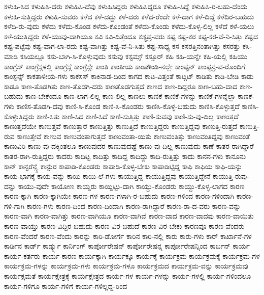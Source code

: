 {ಕಳುಹಿ-ಸಿದ
ಕಳುಹಿಸಿ-ದರು
ಕಳುಹಿಸಿ-ದೆವು
ಕಳುಹಿಸಿದ್ದರು
ಕಳುಹಿಸಿದ್ದರೂ
ಕಳುಹಿ-ಸಿದ್ದೆ
ಕಳುಹಿಸಿ-ರ-ಬಹು-ದೆಂದು
ಕಳುಹಿ-ಸುತ್ತಿದ್ದರು
ಕಳುಹಿ-ಸುವರು
ಕಳೆದ
ಕಳೆ-ದದ್ದು
ಕಳೆ-ದರು
ಕಳೆದ-ರೆಂದೇ
ಕಳೆ-ದಾಗ
ಕಳೆ-ದಿದ್ದೆ
ಕಳೆದಿರ-ಬಹುದು
ಕಳೆದಿ-ರು-ವುದು
ಕಳೆದು
ಕಳೆದು-ಕೊಂಡ
ಕಳೆದು-ಕೊಂಡಂತೆ
ಕಳೆದು-ಕೊಂಡು
ಕಳೆದು-ಕೊಳ್ಳ-ಲಿಲ್ಲ
ಕಳೆದೆ
ಕಳೆ-ಯಲು
ಕಳೆ-ಯುತ್ತಿದ್ದರು
ಕಳೆ-ಯುವು-ದಾಗಿಯೂ
ಕವಿ
ಕವಿ-ದಿತ್ತೆಂದೂ
ಕಶ್ಯಪ್ರ-ವರು
ಕಷ್ಟ
ಕಷ್ಟ-ಕರ
ಕಷ್ಟ-ಕರ-ವೆ-ನಿ-ಸಿತ್ತು
ಕಷ್ಟದ
ಕಷ್ಟ-ಪಟ್ಟೆವು
ಕಷ್ಟ-ವಾಗ-ಲಾ-ರದು
ಕಷ್ಟ-ವಾಗಿತ್ತು
ಕಷ್ಟ-ವೆ-ನಿ-ಸಿತು
ಕಷ್ಟ-ಸಾಧ್ಯ
ಕಸ
ಕಸರತ್ತಿನಂತಾಗಿತ್ತು
ಕಸರತ್ತು
ಕಸಿ-ಮಾಡಿ
ಕಸಿಯಲ್ಲೂ
ಕಸು-ಬಾಗಿ-ಸಿ-ಕೊಳ್ಳುವುದು
ಕಸುವು
ಕಸ್ಟಮ್ಸ್
ಕಸ್ತೂರ್
ಕಹಿ
ಕಹಿ-ಯನ್ನೇ
ಕಹಿ-ಯಲ್ಲಿ
ಕಹಿಯು
ಕಾಂಗ್ರೆಸ್
ಕಾಂಗ್ರೆಸ್ಗಳಲ್ಲಿ
ಕಾಂಗ್ರೆಸ್ಗೆ
ಕಾಂಗ್ರೆಸ್ಗೇ
ಕಾಂತಿ
ಕಾಂತೀಯ
ಕಾಂಪೌಂಡಿ-ನಲ್ಲೇ
ಕಾಂಪ್ಟನ್
ಕಾಂಪ್ಟನ್ರ-ವ-ರೊಂದಿಗೆ
ಕಾಂಸ್ಟನ್ಸ್
ಕಾಕತಾಳೀಯ-ಗಳು
ಕಾಕಸಸ್
ಕಾಕಿನಾಡ-ದಿಂದ
ಕಾಗದ
ಕಾಟ-ವಿತ್ತಂತೆ
ಕಾಟ್ಗಟ್
ಕಾಡಿತು
ಕಾಡಿ-ಬೇಡಿ
ಕಾಡು
ಕಾಡೂ
ಕಾಣ-ತೊಡಗಿತು
ಕಾಣ-ತೊಡಗಿ-ದರು
ಕಾಣತೊಡಗುತ್ತದೆ
ಕಾಣದ
ಕಾಣ-ದಿದ್ದರೂ
ಕಾಣ-ಬಹು-ದಾದ
ಕಾಣ-ಬಹುದು
ಕಾಣ-ಬೇಕೆಂದೂ
ಕಾಣ-ಲಾಗ-ಲಿಲ್ಲ
ಕಾಣ-ಲಿಲ್ಲ
ಕಾಣಲು
ಕಾಣಿಕೆ
ಕಾಣಿಕೆ-ಗಳನ್ನು
ಕಾಣಿಕೆ-ಗಳನ್ನೆಲ್ಲಾ
ಕಾಣಿಕೆ-ಗಳು
ಕಾಣಿಸ-ತೊಡಗಿ-ದವು
ಕಾಣಿ-ಸಿ-ಕೊಂಡ
ಕಾಣಿ-ಸಿ-ಕೊಂಡರು
ಕಾಣಿಸಿ-ಕೊಳ್ಳ-ಬಹುದು
ಕಾಣಿಸಿ-ಕೊಳ್ಳುತ್ತದೆ
ಕಾಣಿಸಿ-ಕೊಳ್ಳುತ್ತಿದ್ದರು
ಕಾಣಿ-ಸಿತು
ಕಾಣಿ-ಸಿದ
ಕಾಣಿ-ಸಿದೆ
ಕಾಣಿ-ಸುತ್ತಿತ್ತು
ಕಾಣಿ-ಸುವವು
ಕಾಣಿ-ಸು-ವು-ದಿಲ್ಲ
ಕಾಣುತ್ತದೆ
ಕಾಣುತ್ತದೆಯೇ
ಕಾಣುತ್ತವೆ
ಕಾಣುತ್ತಾರೆ
ಕಾಣುತ್ತಿತ್ತು
ಕಾಣುತ್ತಿದೆ
ಕಾಣುತ್ತಿದ್ದರು
ಕಾಣುತ್ತಿದ್ದವು
ಕಾಣುತ್ತಿ-ರುತ್ತದೆ
ಕಾಣುತ್ತಿ-ರುವ
ಕಾಣುತ್ತೇವೆ
ಕಾಣುವ
ಕಾಣುವಂತಾಗುತ್ತದೆ
ಕಾಣುವಂತಾ-ಯಿತು
ಕಾಣುವಂತಿತ್ತು
ಕಾಣುವಂತಿದ್ದವು
ಕಾಣುವಂತೆ
ಕಾಣುವಿರಿ
ಕಾಣು-ವು-ದಕ್ಕಿಂತಲೂ
ಕಾಣುವುದರ
ಕಾಣುವುದಷ್ಟೆ
ಕಾಣು-ವು-ದಿಲ್ಲ
ಕಾಣುವುದು
ಕಾಣೆ
ಕಾತರ-ರಾಗಿದ್ದಾರೆ
ಕಾತರ-ರಾಗಿ-ರುತ್ತಿದ್ದರು
ಕಾದರು
ಕಾದಿಟ್ಟ
ಕಾದಿತ್ತು
ಕಾದಿದ್ದ
ಕಾದಿದ್ದು
ಕಾದಿ-ರುತ್ತಿತ್ತು
ಕಾದು
ಕಾನನ-ಗಳು
ಕಾನೂನು
ಕಾನ್
ಕಾನ್ಫರೆನ್ಸ್ಗೆ
ಕಾನ್ಪುರ
ಕಾಪಾಡಿ-ಕೊಂಡರು
ಕಾಪಾಡಿ-ಕೊಳ್ಳ-ಬೇಕು
ಕಾಪಾಡಿಟ್ಟಿದ್ದ
ಕಾಫಿ
ಕಾಫಿಯ
ಕಾಫಿ-ಯನ್ನು
ಕಾಯ-ಭಾಗಕ್ಕೆ
ಕಾಯ-ವನ್ನು
ಕಾಯಿ
ಕಾಯಿ-ಲೆ-ಗಳು
ಕಾಯುತ್ತಿದ್ದ
ಕಾಯುತ್ತಿದ್ದವು
ಕಾಯುತ್ತಿದ್ದೇನೆ
ಕಾಯುತ್ತಿ-ರುವು-ದನ್ನು
ಕಾಯು-ವುದೇ
ಕಾಯೋಣ
ಕಾಯ್ದರು
ಕಾಯ್ದಿಟ್ಟು-ದಾಗಿ
ಕಾಯ್ದು-ಕೊಂಡರು
ಕಾಯ್ದು-ಕೊಳ್ಳ-ಲಾಗದ
ಕಾರಣ
ಕಾರಣ-ಕ್ಕಾಗಿ
ಕಾರಣ-ಕ್ಕಾಗಿಯೇ
ಕಾರಣ-ಗಳ
ಕಾರಣ-ಗಳಾಗಿ-ರ-ಬಹುದು
ಕಾರಣ-ಗಳಿಂದ
ಕಾರಣ-ಗಳಿಂದಾಗಿ
ಕಾರಣ-ಗಳಿ-ಗಾಗಿ
ಕಾರಣ-ಗಳು
ಕಾರಣ-ದಿಂದ
ಕಾರಣ-ದಿಂದಾಗಿ
ಕಾರಣ-ರಾಗಿದ್ದಾರೆ
ಕಾರಣ-ರಾ-ದ-ವರು
ಕಾರಣ-ವನ್ನು
ಕಾರಣ-ವಾಗಿ
ಕಾರಣ-ವಾಗಿತ್ತು
ಕಾರಣ-ವಾಗಿಯೂ
ಕಾರಣ-ವಾಗಿವೆ
ಕಾರಣ-ವಾದ
ಕಾರಣ-ವಾದವು
ಕಾರಣ-ವಾಯಿತು
ಕಾರಣ-ವಾಯ್ತು
ಕಾರಣ-ವಿದ್ದಿರ-ಬಹುದು
ಕಾರಣ-ವಿರ-ಬಹುದೆ
ಕಾರಣ-ವಿರ-ಬೇಕು
ಕಾರಣವೂ
ಕಾರಣ-ವೆಂದರು
ಕಾರಣ-ವೆಂದರೆ
ಕಾರಣ-ವೆಂದು
ಕಾರನ್ನು
ಕಾರಿ-ಡೋರ್ಗೆ
ಕಾರಿನ
ಕಾರಿ-ನಲ್ಲಿ
ಕಾರು
ಕಾರು-ಗಳು
ಕಾರ್
ಕಾರ್ಖಾನೆ-ಗಳ
ಕಾರ್ಡಿನ
ಕಾರ್ಡ್
ಕಾರ್ಡ್ನ್ನು
ಕಾರ್ನಿಂಗ್
ಕಾರ್ಪೋರೇಷನ್
ಕಾರ್ಪೋರೇಷನ್ನ
ಕಾರ್ಪೋರೇಷನ್ನಿಂದ
ಕಾರ್ಬನ್
ಕಾರ್ಯ
ಕಾರ್ಯ-ಕರ್ತರು
ಕಾರ್ಯ-ಕಾರಣ
ಕಾರ್ಯಕ್ಕಾಗಿ
ಕಾರ್ಯಕ್ಕೂ
ಕಾರ್ಯಕ್ಕೆ
ಕಾರ್ಯಕ್ರಮ
ಕಾರ್ಯಕ್ರಮಕ್ಕೆ
ಕಾರ್ಯಕ್ರಮ-ಗಳ
ಕಾರ್ಯಕ್ರಮ-ಗಳನ್ನು
ಕಾರ್ಯಕ್ರಮ-ಗಳು
ಕಾರ್ಯಕ್ರಮ-ಗಳೂ
ಕಾರ್ಯಕ್ರಮದ
ಕಾರ್ಯಕ್ರಮ-ವನ್ನು
ಕಾರ್ಯಕ್ರಮವು
ಕಾರ್ಯಕ್ಷಮತೆ
ಕಾರ್ಯಕ್ಷೇತ್ರಕ್ಕೆ
ಕಾರ್ಯಕ್ಷೇತ್ರದ
ಕಾರ್ಯ-ಗಳ
ಕಾರ್ಯ-ಗಳನ್ನು
ಕಾರ್ಯ-ಗಳಲ್ಲಿ
ಕಾರ್ಯ-ಗಳಿಂದಲೂ
ಕಾರ್ಯ-ಗಳಿಗೂ
ಕಾರ್ಯ-ಗಳಿಗೆ
ಕಾರ್ಯ-ಗಳಿಲ್ಲದ್ದ-ರಿಂದ
}
